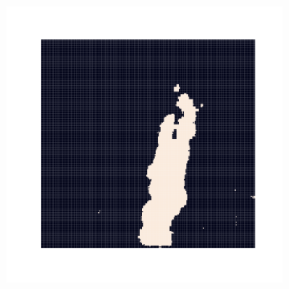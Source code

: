 \documentclass{article}
\begin{document}
\begin{figure}[htbp]
\begin{subfigure}[t]{.4\textwidth}
      \caption{}
      \label{fig:brightness_heatmap}
  \end{subfigure}
   \begin{subfigure}[t]{.35\textwidth}
      \centering
      \includegraphics[width=\textwidth ,keepaspectratio]{figures/binary_fire_image.pdf}
      \caption{}
      \label{fig:binary_fire_image}
  \end{subfigure}
  \caption{} 
  \label{fig:fire_image_processing}
\end{figure}
\end{document}
